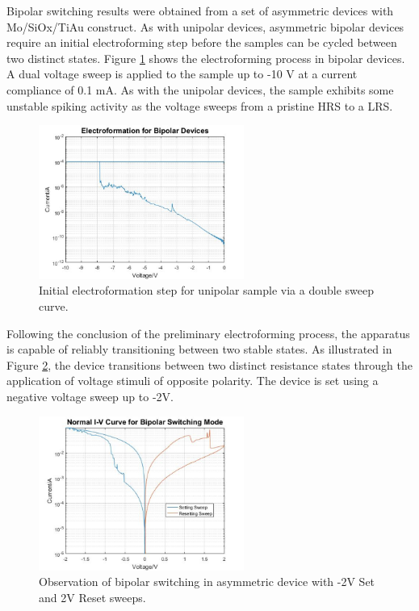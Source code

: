 \noindent  Bipolar switching results were obtained from a set of asymmetric devices with Mo/SiOx/TiAu construct. As with unipolar devices, asymmetric bipolar devices require an initial electroforming step before the samples can be cycled between two distinct states. Figure \ref{fig:3l} shows the electroforming process in bipolar devices. A dual voltage sweep is applied to the sample up to -10 V at a current compliance of 0.1 mA. As with the unipolar devices, the sample exhibits some unstable spiking activity as the voltage sweeps from a pristine HRS to a LRS.\\


\begin{figure}[htbp!] 
    \centering    
    \includegraphics[width=0.6\textwidth]{Chapter3/Figs/l.png}
    \caption[Initial electroformation step for unipolar sample via a double sweep curve.]{Initial electroformation step for unipolar sample via a double sweep curve.}
    \label{fig:3l}
\end{figure}


\noindent Following the conclusion of the preliminary electroforming process, the apparatus is capable of reliably transitioning between two stable states. As illustrated in Figure \ref{fig:3m}, the device transitions between two distinct resistance states through the application of voltage stimuli of opposite polarity. The device is set using a negative voltage sweep up to -2V. \\

\begin{figure}[htbp!] 
    \centering    
    \includegraphics[width=0.6\textwidth]{Chapter3/Figs/m.png}
    \caption[Observation of bipolar switching in asymmetric device with -2V Set and 2V Reset sweeps.]{Observation of bipolar switching in asymmetric device with -2V Set and 2V Reset sweeps.}
    \label{fig:3m}
\end{figure}

